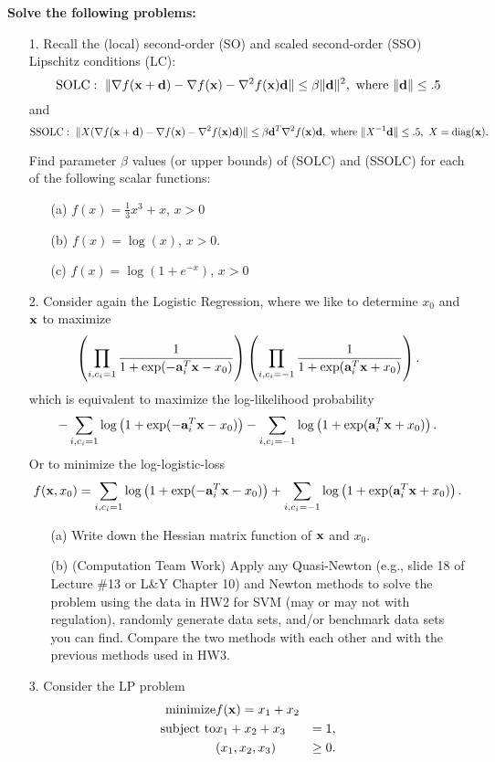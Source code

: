 \documentclass[12pt,letterpaper]{article}
\renewcommand\a{{\bf a}}
\renewcommand\d{{\bf d}}
\newcommand\x{{\bf x}}
\begin{document}
{\textbf{Solve the following problems:}}
\begin{enumerate}
\item[1.] Recall the (local) second-order (SO) and scaled second-order (SSO) Lipschitz conditions (LC):
\[\mbox{SOLC}:\ \|\nabla f(\x+\d)-\nabla f(\x)-\nabla^2 f(\x)\d\|\le \beta\|\d\|^2,\ \mbox{where}\ \|\d\|\le .5\]
and
\[\mbox{SSOLC}:\ \|X(\nabla f(\x+\d)-\nabla f(\x)-\nabla^2 f(\x)\d)\|\le \beta\d^T\nabla^2f(\x)\d,\ \mbox{where}\ \|X^{-1}\d\|\le .5,\ X=\mbox{diag}(\x).\]

Find parameter $\beta$ values (or upper bounds)  of (SOLC) and (SSOLC) for each of the following scalar functions:
\begin{itemize}
\item[(a)] $f(x)=\frac{1}{3}x^3+x$, $x>0$
\item[(b)] $f(x)=\log(x)$, $x>0$.
\item[(c)] $f(x)=\log(1+e^{-x})$, $x> 0$
\end{itemize}

\item[2.] Consider again the Logistic Regression, where we like to determine $x_0$ and $\x$ to maximize
\[
\left(\prod_{i,c_i=1}\frac{1}{1+\exp(-\a_i^T\x-x_0)}\right)
\left(\prod_{i,c_i=-1}\frac{1}{1+\exp(\a_i^T\x+x_0)}\right).
\]
which is equivalent to maximize the log-likelihood probability
\[
-\sum_{i,c_i=1}\log\left(1+\exp(-\a_i^T\x-x_0)\right)-\sum_{i,c_i=-1}\log\left(1+\exp(\a_i^T\x+x_0)\right).
\]
Or to minimize the log-logistic-loss
\[
f(\x,x_0)=\sum_{i,c_i=1}\log\left(1+\exp(-\a_i^T\x-x_0)\right)+\sum_{i,c_i=-1}\log\left(1+\exp(\a_i^T\x+x_0)\right).
\]
\begin{enumerate}
\item[(a)] Write down the Hessian matrix function of $\x$ and $x_0$.

\item[(b)] (Computation Team Work) Apply any Quasi-Newton (e.g., slide 18 of Lecture \#13 or L\&Y Chapter 10) and Newton methods to solve the problem using the data in HW2 for SVM (may or may not with regulation), randomly generate data sets, and/or benchmark data sets you can find. Compare the two methods with each other and with the previous methods used in HW3.
\end{enumerate}

\item[3.] Consider the LP problem
\begin{eqnarray*}
\mbox{minimize}   & f(\x)=x_1+x_2 &\\
\mbox{subject to} & x_1+x_2+x_3  &=1,\\
                  & (x_1,x_2,x_3)&\ge 0 .
\end{eqnarray*}


\end{enumerate}
\end{document}
